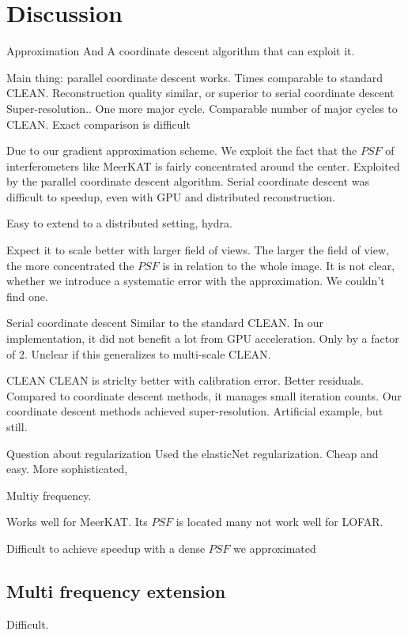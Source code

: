 \section{Discussion}\label{discussion}
Approximation
And A coordinate descent algorithm that can  exploit it.

Main thing: parallel coordinate descent works.
Times comparable to standard CLEAN.
Reconstruction quality similar, or superior to serial coordinate descent
Super-resolution..
One more major cycle.
Comparable number of major cycles to CLEAN. Exact comparison is difficult

Due to our gradient approximation scheme. We exploit the fact that the $PSF$ of interferometers like MeerKAT is fairly concentrated around the center.
Exploited by the parallel coordinate descent algorithm. 
Serial coordinate descent was difficult to speedup, even with GPU and distributed reconstruction.

Easy to extend to a distributed setting, hydra.

Expect it to scale better with larger field of views. The larger the field of view, the more concentrated the $PSF$ is in relation to the whole image.
It is not clear, whether we introduce a systematic error with the approximation. We couldn't find one.

Serial coordinate descent
Similar to the standard CLEAN.
In our implementation, it did not benefit a lot from GPU acceleration. Only by a factor of 2. Unclear if this generalizes to multi-scale CLEAN.

CLEAN
CLEAN is striclty better with calibration error.
Better residuals. Compared to coordinate descent methods, it manages small iteration counts.
Our coordinate descent methods achieved super-resolution. Artificial example, but still.

Question about regularization
Used the elasticNet regularization. Cheap and easy. More sophisticated, 

Multiy frequency.






Works well for MeerKAT. Its $PSF$ is located many not work well for LOFAR.

Difficult to achieve speedup with a dense $PSF$ we approximated












\subsection{Multi frequency extension}\label{discussion:mfs}
Difficult.

